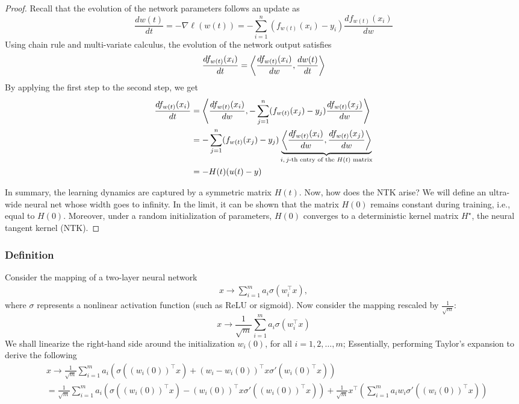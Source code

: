 \begin{proof} Recall that the evolution of the network parameters follows an update as
\[ \frac {d w(t)} {d t} = -\nabla \ell(w(t)) = - \sum_{i=1}^n ( f_{w(t)}(x_i) - y_i ) \frac {d f_{w(t)}(x_i)} {d w} \]
Using chain rule and multi-variate calculus, the evolution of the network output satisfies
\[ \frac {d f_{w(t)}(x_i)} { d t } = \left\langle \frac {d f_{w(t)}(x_i)} {d w}, \frac {d w(t)} {dt} \right\rangle \]
By applying the first step to the second step, we get
\begin{align*} 
    \frac {d f_{w(t)}(x_i)} {d t} 
    &= \left\langle  \frac {d f_{w(t)}(x_i)} {dw} , - \sum_{j=1}^n (f_{w(t)}(x_j) - y_j) \frac {d f_{w(t)}(x_j)} {d w} \right\rangle \\
    &= - \sum_{j=1}^n (f_{w(t)}(x_j) - y_j) \underbrace{\left\langle  \frac {d f_{w(t)}(x_i)} {d w} , \frac {d f_{w(t)} (x_j)} {d w} \right\rangle }_{\text{$i, j$-th entry of the $H(t)$ matrix}} \\
    &= - H(t) (u(t) - y)
\end{align*}

In summary, the learning dynamics are captured by a symmetric matrix $H(t)$.
Now, how does the NTK arise?
We will define an ultra-wide neural net whose width goes to infinity.
In the limit, it can be shown that the matrix $H(0)$ remains constant during training, i.e., equal to $H(0)$.
Moreover, under a random initialization of parameters, $H(0)$ converges to a deterministic kernel matrix $H^{\star}$, the neural tangent kernel (NTK).
\end{proof}

\subsubsection{Definition}

Consider the mapping of a two-layer neural network
\begin{align} x \rightarrow \sum_{i=1}^m a_i \sigma(w_i^{\top} x), \label{eq_twolayer} \end{align}
where $\sigma$ represents a nonlinear activation function (such as ReLU or sigmoid).
Now consider the mapping rescaled by $\frac 1 {\sqrt m}$:
\[ x \rightarrow \frac 1 {\sqrt m} \sum_{i=1}^m a_i \sigma(w_i^{\top} x) \]
We shall linearize the right-hand side around the initialization $w_i(0)$, for all $i = 1, 2, \dots, m$;
Essentially, performing Taylor's expansion to derive the following
\begin{align*} 
    &x \rightarrow \frac 1 {\sqrt m} \sum_{i=1}^m a_i \left( \sigma( (w_i(0))^{\top} x ) + (w_i - w_i(0))^{\top} x \sigma'( w_i(0)^{\top} x ) \right) \\
    & = \frac 1 {\sqrt m } \sum_{i=1}^m a_i \left( \sigma( (w_i(0))^{\top} x ) - (w_i(0))^{\top} x \sigma'( (w_i(0))^{\top} x )  \right) + \frac 1 {\sqrt m} x^{\top} \left(\sum_{i=1}^m a_i w_i \sigma'( (w_i(0))^{\top} x ) \right)
\end{align*}

